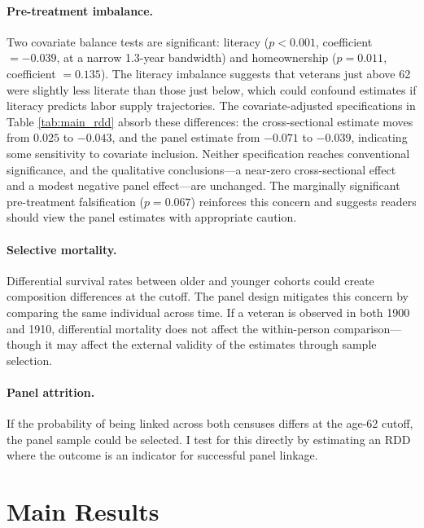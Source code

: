 \documentclass[12pt]{article}
\begin{document}
\paragraph{Pre-treatment imbalance.} Two covariate balance tests are significant: literacy ($p < 0.001$, coefficient $= -0.039$, at a narrow 1.3-year bandwidth) and homeownership ($p = 0.011$, coefficient $= 0.135$). The literacy imbalance suggests that veterans just above 62 were slightly less literate than those just below, which could confound estimates if literacy predicts labor supply trajectories. The covariate-adjusted specifications in Table \ref{tab:main_rdd} absorb these differences: the cross-sectional estimate moves from $0.025$ to $-0.043$, and the panel estimate from $-0.071$ to $-0.039$, indicating some sensitivity to covariate inclusion. Neither specification reaches conventional significance, and the qualitative conclusions---a near-zero cross-sectional effect and a modest negative panel effect---are unchanged. The marginally significant pre-treatment falsification ($p = 0.067$) reinforces this concern and suggests readers should view the panel estimates with appropriate caution.

\paragraph{Selective mortality.} Differential survival rates between older and younger cohorts could create composition differences at the cutoff. The panel design mitigates this concern by comparing the same individual across time. If a veteran is observed in both 1900 and 1910, differential mortality does not affect the within-person comparison---though it may affect the external validity of the estimates through sample selection.

\paragraph{Panel attrition.} If the probability of being linked across both censuses differs at the age-62 cutoff, the panel sample could be selected. I test for this directly by estimating an RDD where the outcome is an indicator for successful panel linkage.


\section{Main Results}
\end{document}
